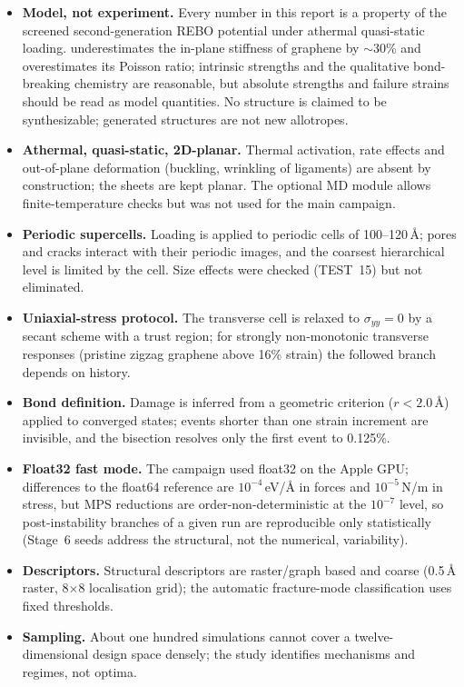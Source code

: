 \begin{itemize}
\item \textbf{Model, not experiment.} Every number in this report is a property of the screened second-generation REBO potential under athermal quasi-static loading. \rebo{} underestimates the in-plane stiffness of graphene by $\sim$30\% and overestimates its Poisson ratio; intrinsic strengths and the qualitative bond-breaking chemistry are reasonable, but absolute strengths and failure strains should be read as model quantities. No structure is claimed to be synthesizable; generated structures are not new allotropes.
\item \textbf{Athermal, quasi-static, 2D-planar.} Thermal activation, rate effects and out-of-plane deformation (buckling, wrinkling of ligaments) are absent by construction; the sheets are kept planar. The optional MD module allows finite-temperature checks but was not used for the main campaign.
\item \textbf{Periodic supercells.} Loading is applied to periodic cells of 100--120\,\AA; pores and cracks interact with their periodic images, and the coarsest hierarchical level is limited by the cell. Size effects were checked (TEST~15) but not eliminated.
\item \textbf{Uniaxial-stress protocol.} The transverse cell is relaxed to $\sigma_{yy}=0$ by a secant scheme with a trust region; for strongly non-monotonic transverse responses (pristine zigzag graphene above 16\% strain) the followed branch depends on history.
\item \textbf{Bond definition.} Damage is inferred from a geometric criterion ($r<2.0$\,\AA) applied to converged states; events shorter than one strain increment are invisible, and the bisection resolves only the first event to 0.125\%.
\item \textbf{Float32 fast mode.} The campaign used float32 on the Apple GPU; differences to the float64 reference are $10^{-4}$\,eV/\AA{} in forces and $10^{-5}$\,N/m in stress, but MPS reductions are order-non-deterministic at the $10^{-7}$ level, so post-instability branches of a given run are reproducible only statistically (Stage~6 seeds address the structural, not the numerical, variability).
\item \textbf{Descriptors.} Structural descriptors are raster/graph based and coarse (0.5\,\AA{} raster, 8$\times$8 localisation grid); the automatic fracture-mode classification uses fixed thresholds.
\item \textbf{Sampling.} About one hundred simulations cannot cover a twelve-dimensional design space densely; the study identifies mechanisms and regimes, not optima.
\end{itemize}
